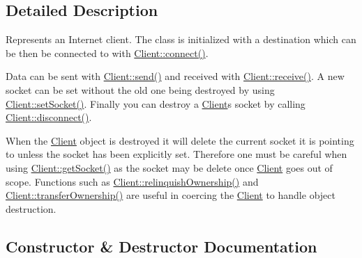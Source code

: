 \subsection{Detailed Description}
Represents an Internet client. The class is initialized with a destination which can be then be connected to with \hyperlink{class_communication_1_1_client_a0fa54f72440e34d7659d6289ce4219d5}{Client\+::connect()}. 

Data can be sent with \hyperlink{class_communication_1_1_client_a9f646713fab7ee53a86cc4391c65ba96}{Client\+::send()} and received with \hyperlink{class_communication_1_1_client_a333fae358f61a607582a3dc1e849ccd4}{Client\+::receive()}. A new socket can be set without the old one being destroyed by using \hyperlink{class_communication_1_1_client_ac97183c35c7227c71dc43ed713efb8cb}{Client\+::set\+Socket()}. Finally you can destroy a \hyperlink{class_communication_1_1_client}{Client}\textquotesingle{}s socket by calling \hyperlink{class_communication_1_1_client_ab9a6013d31a6fd6a2365270bbe8ac207}{Client\+::disconnect()}.

When the \hyperlink{class_communication_1_1_client}{Client} object is destroyed it will delete the current socket it is pointing to unless the socket has been explicitly set. Therefore one must be careful when using \hyperlink{class_communication_1_1_client_a87a0efa909c795c7680512bd0c35c883}{Client\+::get\+Socket()} as the socket may be delete once \hyperlink{class_communication_1_1_client}{Client} goes out of scope. Functions such as \hyperlink{class_communication_1_1_client_a5ac457cde6469d51fc9a9424bf673206}{Client\+::relinquish\+Ownership()} and \hyperlink{class_communication_1_1_client_a6c33c673b779dc2443f66ed453178f43}{Client\+::transfer\+Ownership()} are useful in coercing the \hyperlink{class_communication_1_1_client}{Client} to handle object destruction. 

\subsection{Constructor \& Destructor Documentation}
\hypertarget{class_communication_1_1_client_aea201d12c91899407f6b1a8f996d548d}{}
